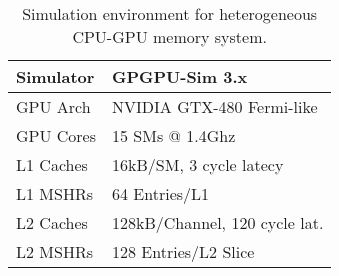 \begin{table}[t]
\begin{center}
\begin{tabular}{|l|l|}
\hline
Simulator & GPGPU-Sim 3.x\\
\hline
GPU Arch & NVIDIA GTX-480 Fermi-like\\
\hline
GPU Cores& 15 {\color{black}SMs} @ 1.4Ghz\\
\hline
L1 Caches & 16kB/SM, 3 cycle latecy \\
\hline
L1 MSHRs & 64 Entries/L1\\
\hline
L2 Caches & 128kB/Channel, 120 cycle lat.\\
\hline
L2 MSHRs & 128 Entries/L2 Slice\\
\hline
\end{tabular}
\caption{Simulation environment for heterogeneous CPU-GPU memory system.}
\label{tab:methodology}
\end{center}
\vspace{-0.15in}
\end{table}
